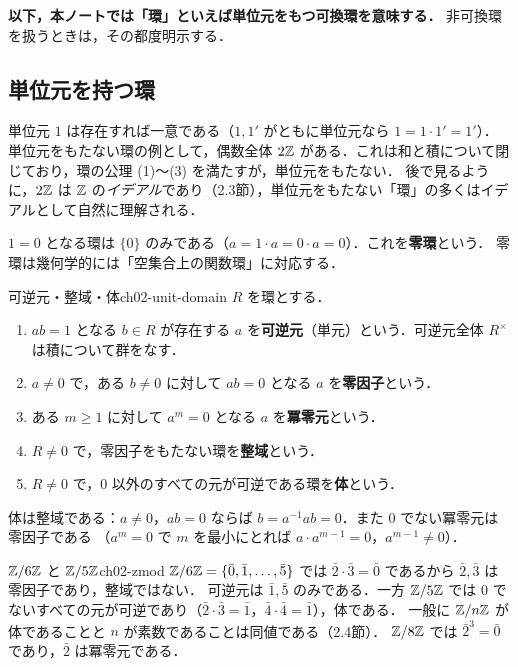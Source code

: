 \textbf{以下，本ノートでは「環」といえば単位元をもつ可換環を意味する．}
非可換環を扱うときは，その都度明示する．

\subsection{単位元を持つ環}

単位元 $1$ は存在すれば一意である（$1,1'$ がともに単位元なら $1=1\cdot1'=1'$）．
単位元をもたない環の例として，偶数全体 $2\mathbb{Z}$ がある．これは和と積について閉じており，環の公理 (1)〜(3) を満たすが，単位元をもたない．
後で見るように，$2\mathbb{Z}$ は $\mathbb{Z}$ の\emph{イデアル}であり（2.3節），単位元をもたない「環」の多くはイデアルとして自然に理解される．

$1=0$ となる環は $\{0\}$ のみである（$a=1\cdot a=0\cdot a=0$）．これを\textbf{零環}という．
零環は幾何学的には「空集合上の関数環」に対応する．

\begin{mydef}{可逆元・整域・体}{ch02-unit-domain}
$R$ を環とする．
\begin{enumerate}
  \item $ab=1$ となる $b\in R$ が存在する $a$ を\textbf{可逆元}（単元）という．可逆元全体 $R^\times$ は積について群をなす．
  \item $a\ne0$ で，ある $b\ne0$ に対して $ab=0$ となる $a$ を\textbf{零因子}という．
  \item ある $m\ge1$ に対して $a^m=0$ となる $a$ を\textbf{冪零元}という．
  \item $R\ne0$ で，零因子をもたない環を\textbf{整域}という．
  \item $R\ne0$ で，$0$ 以外のすべての元が可逆である環を\textbf{体}という．
\end{enumerate}
\end{mydef}

体は整域である：$a\ne0$，$ab=0$ ならば $b=a^{-1}ab=0$．また $0$ でない冪零元は零因子である
（$a^m=0$ で $m$ を最小にとれば $a\cdot a^{m-1}=0$，$a^{m-1}\ne0$）．

\begin{myex}{$\mathbb{Z}/6\mathbb{Z}$ と $\mathbb{Z}/5\mathbb{Z}$}{ch02-zmod}
$\mathbb{Z}/6\mathbb{Z}=\{\bar0,\bar1,\dots,\bar5\}$ では $\bar2\cdot\bar3=\bar0$ であるから $\bar2,\bar3$ は零因子であり，整域ではない．
可逆元は $\bar1,\bar5$ のみである．一方 $\mathbb{Z}/5\mathbb{Z}$ では $0$ でないすべての元が可逆であり（$\bar2\cdot\bar3=\bar1$，$\bar4\cdot\bar4=\bar1$），体である．
一般に $\mathbb{Z}/n\mathbb{Z}$ が体であることと $n$ が素数であることは同値である（2.4節）．
$\mathbb{Z}/8\mathbb{Z}$ では $\bar2^3=\bar0$ であり，$\bar2$ は冪零元である．
\end{myex}

